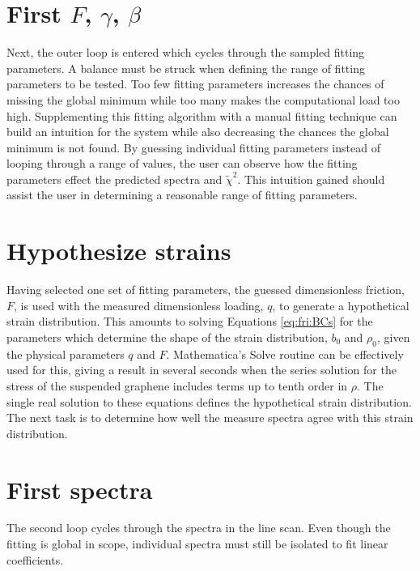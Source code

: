\section*{First $F$, $\gamma$, $\beta$}
Next, the outer loop is entered which cycles through the sampled fitting parameters.
A balance must be struck when defining the range of fitting parameters to be tested.
Too few fitting parameters increases the chances of missing the global minimum while too many makes the computational load too high.
Supplementing this fitting algorithm with a manual fitting technique can build an intuition for the system while also decreasing the chances the global minimum is not found.
By guessing individual fitting parameters instead of looping through a range of values, the user can observe how the fitting parameters effect the predicted spectra and $\tilde{\chi}^2$.
This intuition gained should assist the user in determining a reasonable range of fitting parameters.

\section*{Hypothesize strains}
Having selected one set of fitting parameters, the guessed dimensionless friction, $F$, is used with the measured dimensionless loading, $q$, to generate a hypothetical strain distribution.
This amounts to solving Equations \ref{eq:fri:BCs} for the parameters which determine the shape of the strain distribution, $b_0$ and $\rho_0$, given the physical parameters $q$ and $F$.
Mathematica's Solve routine can be effectively used for this, giving a result in several seconds when the series solution for the stress of the suspended graphene includes terms up to tenth order in $\rho$.
The single real solution to these equations defines the hypothetical strain distribution.
The next task is to determine how well the measure spectra agree with this strain distribution.

\section*{First spectra}
The second loop cycles through the spectra in the line scan.
Even though the fitting is global in scope, individual spectra must still be isolated to fit linear coefficients.

